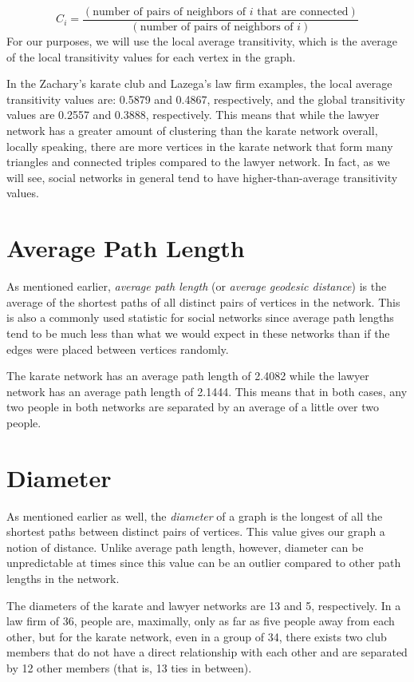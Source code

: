 \documentclass[12pt,twoside]{amherstthesis}
\begin{document}
  \[ C_{i} = \frac {(\text{number of pairs of neighbors of } i \text{ that are connected})} {(\text{number of pairs of neighbors of } i)} \]
  For our purposes, we will use the local average transitivity, which is
  the average of the local transitivity values for each vertex in the
  graph.
  
  In the Zachary's karate club and Lazega's law firm examples, the local
  average transitivity values are: 0.5879 and 0.4867, respectively, and
  the global transitivity values are 0.2557 and 0.3888, respectively. This
  means that while the lawyer network has a greater amount of clustering
  than the karate network overall, locally speaking, there are more
  vertices in the karate network that form many triangles and connected
  triples compared to the lawyer network. In fact, as we will see, social
  networks in general tend to have higher-than-average transitivity
  values.
  
  \section{Average Path Length}\label{average-path-length}
  
  As mentioned earlier, \emph{average path length} (or \emph{average
  geodesic distance}) is the average of the shortest paths of all distinct
  pairs of vertices in the network. This is also a commonly used statistic
  for social networks since average path lengths tend to be much less than
  what we would expect in these networks than if the edges were placed
  between vertices randomly.
  
  The karate network has an average path length of 2.4082 while the lawyer
  network has an average path length of 2.1444. This means that in both
  cases, any two people in both networks are separated by an average of a
  little over two people.
  
  \section{Diameter}\label{diameter}
  
  As mentioned earlier as well, the \emph{diameter} of a graph is the
  longest of all the shortest paths between distinct pairs of vertices.
  This value gives our graph a notion of distance. Unlike average path
  length, however, diameter can be unpredictable at times since this value
  can be an outlier compared to other path lengths in the network.
  
  The diameters of the karate and lawyer networks are 13 and 5,
  respectively. In a law firm of 36, people are, maximally, only as far as
  five people away from each other, but for the karate network, even in a
  group of 34, there exists two club members that do not have a direct
  relationship with each other and are separated by 12 other members (that
  is, 13 ties in between).
  
\end{document}
